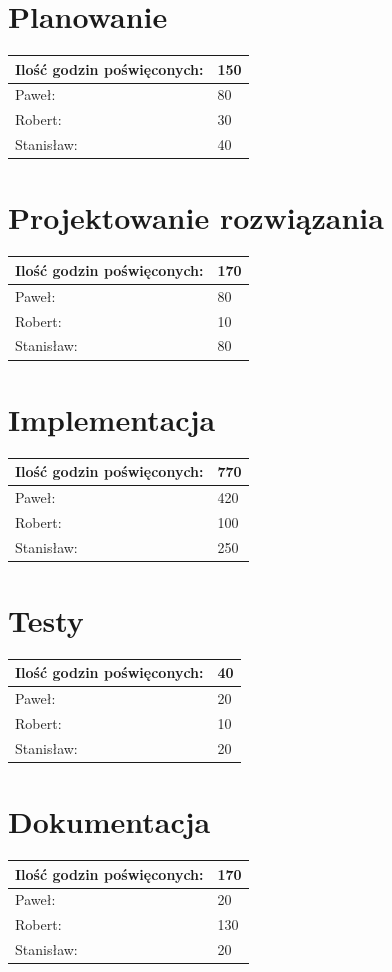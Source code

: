\documentclass[a4paper,11pt]{report}
\begin{document}
\section{Planowanie}
\begin{tabular}{|l|l|}
\hline
Ilość godzin poświęconych: & 150\\
\hline
Paweł: & 80\\
\hline
Robert: & 30\\
\hline
Stanisław: & 40\\
\hline
\end{tabular}

\section{Projektowanie rozwiązania}
\begin{tabular}{|l|l|}
\hline
Ilość godzin poświęconych: & 170\\
\hline
Paweł: & 80\\
\hline
Robert: & 10\\
\hline
Stanisław: & 80\\
\hline
\end{tabular}

\section{Implementacja}
\begin{tabular}{|l|l|}
\hline
Ilość godzin poświęconych: & 770\\
\hline
Paweł: & 420\\
\hline
Robert: & 100\\
\hline
Stanisław: & 250\\
\hline
\end{tabular}

\section{Testy}
\begin{tabular}{|l|l|}
\hline
Ilość godzin poświęconych: & 40\\
\hline
Paweł: & 20\\
\hline
Robert: & 10\\
\hline
Stanisław: & 20\\
\hline
\end{tabular}

\section{Dokumentacja}
\begin{tabular}{|l|l|}
\hline
Ilość godzin poświęconych: & 170\\
\hline
Paweł: & 20\\
\hline
Robert: & 130\\
\hline
Stanisław: & 20\\
\hline
\end{tabular}
\vspace{1cm}
\end{document}
